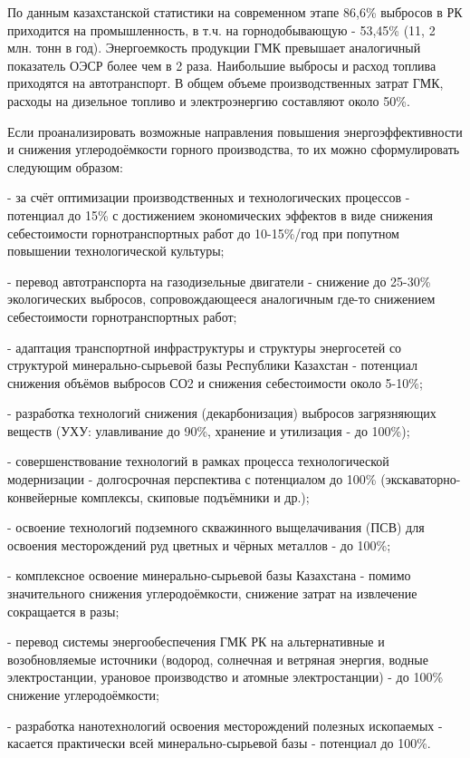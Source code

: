 \begin{multicols}{2}
По данным казахстанской статистики на современном этапе 86,6\% выбросов
в РК приходится на промышленность, в т.ч. на горнодобывающую - 53,45\%
(11, 2 млн. тонн в год). Энергоемкость продукции ГМК превышает
аналогичный показатель ОЭСР более чем в 2 раза. Наибольшие выбросы и
расход топлива приходятся на автотранспорт. В общем объеме
производственных затрат ГМК, расходы на дизельное топливо и
электроэнергию составляют около 50\%.

Если проанализировать возможные направления повышения
энергоэффективности и снижения углеродоёмкости горного производства, то
их можно сформулировать следующим образом:

- за счёт оптимизации производственных и технологических процессов -
потенциал до 15\% с достижением экономических эффектов в виде снижения
себестоимости горнотранспортных работ до 10-15\%/год при попутном
повышении технологической культуры;

- перевод автотранспорта на газодизельные двигатели - снижение до
25-30\% экологических выбросов, сопровождающееся аналогичным где-то
снижением себестоимости горнотранспортных работ;

- адаптация транспортной инфраструктуры и структуры энергосетей со
структурой минерально-сырьевой базы Республики Казахстан - потенциал
снижения объёмов выбросов СО2 и снижения себестоимости около 5-10\%;

- разработка технологий снижения (декарбонизация) выбросов загрязняющих
веществ (УХУ: улавливание до 90\%, хранение и утилизация - до 100\%);

- совершенствование технологий в рамках процесса технологической
модернизации - долгосрочная перспектива с потенциалом до 100\%
(экскаваторно-конвейерные комплексы, скиповые подъёмники и др.);

- освоение технологий подземного скважинного выщелачивания (ПСВ) для
освоения месторождений руд цветных и чёрных металлов - до 100\%;

- комплексное освоение минерально-сырьевой базы Казахстана - помимо
значительного снижения углеродоёмкости, снижение затрат на извлечение
сокращается в разы;

- перевод системы энергообеспечения ГМК РК на альтернативные и
возобновляемые источники (водород, солнечная и ветряная энергия, водные
электростанции, урановое производство и атомные электростанции) - до
100\% снижение углеродоёмкости;

- разработка нанотехнологий освоения месторождений полезных ископаемых
- касается практически всей минерально-сырьевой базы - потенциал до
100\%.


\end{multicols}
